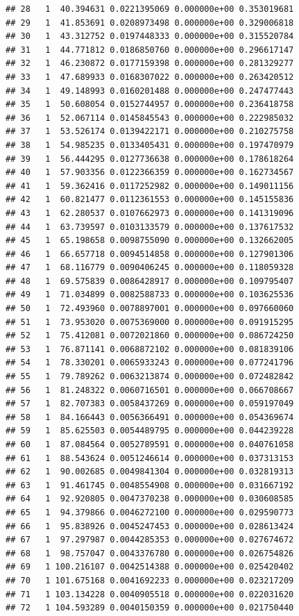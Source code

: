 \documentclass[article]{jss}\usepackage[]{graphicx}\usepackage[]{xcolor}
\makeatletter
\newenvironment{kframe}{%
 \def\at@end@of@kframe{}%
 \ifinner\ifhmode%
  \def\at@end@of@kframe{\end{minipage}}%
  \begin{minipage}{\columnwidth}%
 \fi\fi%
 \def\FrameCommand##1{\hskip\@totalleftmargin \hskip-\fboxsep
 \colorbox{shadecolor}{##1}\hskip-\fboxsep
     \hskip-\linewidth \hskip-\@totalleftmargin \hskip\columnwidth}%
 \MakeFramed {\advance\hsize-\width
   \@totalleftmargin\z@ \linewidth\hsize
   \@setminipage}}%
 {\par\unskip\endMakeFramed%
 \at@end@of@kframe}
\newenvironment{knitrout}{}{} %
\makeatother
\begin{document}
\begin{knitrout}
\begin{kframe}
\begin{verbatim}
## 28   1  40.394631 0.0221395069 0.000000e+00 0.353019681
## 29   1  41.853691 0.0208973498 0.000000e+00 0.329006818
## 30   1  43.312752 0.0197448333 0.000000e+00 0.315520784
## 31   1  44.771812 0.0186850760 0.000000e+00 0.296617147
## 32   1  46.230872 0.0177159398 0.000000e+00 0.281329277
## 33   1  47.689933 0.0168307022 0.000000e+00 0.263420512
## 34   1  49.148993 0.0160201488 0.000000e+00 0.247477443
## 35   1  50.608054 0.0152744957 0.000000e+00 0.236418758
## 36   1  52.067114 0.0145845543 0.000000e+00 0.222985032
## 37   1  53.526174 0.0139422171 0.000000e+00 0.210275758
## 38   1  54.985235 0.0133405431 0.000000e+00 0.197470979
## 39   1  56.444295 0.0127736638 0.000000e+00 0.178618264
## 40   1  57.903356 0.0122366359 0.000000e+00 0.162734567
## 41   1  59.362416 0.0117252982 0.000000e+00 0.149011156
## 42   1  60.821477 0.0112361553 0.000000e+00 0.145155836
## 43   1  62.280537 0.0107662973 0.000000e+00 0.141319096
## 44   1  63.739597 0.0103133579 0.000000e+00 0.137617532
## 45   1  65.198658 0.0098755090 0.000000e+00 0.132662005
## 46   1  66.657718 0.0094514858 0.000000e+00 0.127901306
## 47   1  68.116779 0.0090406245 0.000000e+00 0.118059328
## 48   1  69.575839 0.0086428917 0.000000e+00 0.109795407
## 49   1  71.034899 0.0082588733 0.000000e+00 0.103625536
## 50   1  72.493960 0.0078897001 0.000000e+00 0.097660060
## 51   1  73.953020 0.0075369000 0.000000e+00 0.091915295
## 52   1  75.412081 0.0072021860 0.000000e+00 0.086724250
## 53   1  76.871141 0.0068872102 0.000000e+00 0.081839106
## 54   1  78.330201 0.0065933243 0.000000e+00 0.077241796
## 55   1  79.789262 0.0063213874 0.000000e+00 0.072482842
## 56   1  81.248322 0.0060716501 0.000000e+00 0.066708667
## 57   1  82.707383 0.0058437269 0.000000e+00 0.059197049
## 58   1  84.166443 0.0056366491 0.000000e+00 0.054369674
## 59   1  85.625503 0.0054489795 0.000000e+00 0.044239228
## 60   1  87.084564 0.0052789591 0.000000e+00 0.040761058
## 61   1  88.543624 0.0051246614 0.000000e+00 0.037313153
## 62   1  90.002685 0.0049841304 0.000000e+00 0.032819313
## 63   1  91.461745 0.0048554908 0.000000e+00 0.031667192
## 64   1  92.920805 0.0047370238 0.000000e+00 0.030608585
## 65   1  94.379866 0.0046272100 0.000000e+00 0.029590773
## 66   1  95.838926 0.0045247453 0.000000e+00 0.028613424
## 67   1  97.297987 0.0044285353 0.000000e+00 0.027674672
## 68   1  98.757047 0.0043376780 0.000000e+00 0.026754826
## 69   1 100.216107 0.0042514388 0.000000e+00 0.025420402
## 70   1 101.675168 0.0041692233 0.000000e+00 0.023217209
## 71   1 103.134228 0.0040905518 0.000000e+00 0.022031620
## 72   1 104.593289 0.0040150359 0.000000e+00 0.021750440

\end{verbatim}
\end{kframe}
\end{knitrout}
\end{document}
